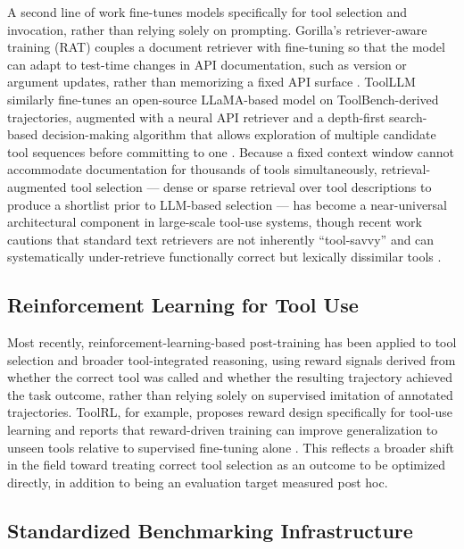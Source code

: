 \documentclass[acmsmall]{acmart}
\begin{document}
A second line of work fine-tunes models specifically for tool selection and invocation, rather than relying solely on prompting. Gorilla's retriever-aware training (RAT) couples a document retriever with fine-tuning so that the model can adapt to test-time changes in API documentation, such as version or argument updates, rather than memorizing a fixed API surface \citep{patil2023gorilla}. ToolLLM similarly fine-tunes an open-source LLaMA-based model on ToolBench-derived trajectories, augmented with a neural API retriever and a depth-first search-based decision-making algorithm that allows exploration of multiple candidate tool sequences before committing to one \citep{qin2024toolllm}. Because a fixed context window cannot accommodate documentation for thousands of tools simultaneously, retrieval-augmented tool selection --- dense or sparse retrieval over tool descriptions to produce a shortlist prior to LLM-based selection --- has become a near-universal architectural component in large-scale tool-use systems, though recent work cautions that standard text retrievers are not inherently ``tool-savvy'' and can systematically under-retrieve functionally correct but lexically dissimilar tools \citep{shi2025toolretrieval}.

\subsection{Reinforcement Learning for Tool Use}
\label{sec:rl}

Most recently, reinforcement-learning-based post-training has been applied to tool selection and broader tool-integrated reasoning, using reward signals derived from whether the correct tool was called and whether the resulting trajectory achieved the task outcome, rather than relying solely on supervised imitation of annotated trajectories. ToolRL, for example, proposes reward design specifically for tool-use learning and reports that reward-driven training can improve generalization to unseen tools relative to supervised fine-tuning alone \citep{qian2025toolrl}. This reflects a broader shift in the field toward treating correct tool selection as an outcome to be optimized directly, in addition to being an evaluation target measured post hoc.

\subsection{Standardized Benchmarking Infrastructure}
\label{sec:benchmarking}
\end{document}
